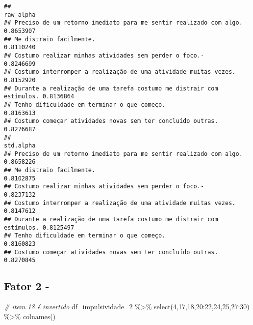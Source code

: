 \documentclass[
]{article}
\newenvironment{Shaded}{\begin{snugshade}}{\end{snugshade}}
\newcommand{\CommentTok}[1]{\textcolor[rgb]{0.56,0.35,0.01}{\textit{#1}}}
\newcommand{\DecValTok}[1]{\textcolor[rgb]{0.00,0.00,0.81}{#1}}
\newcommand{\FunctionTok}[1]{\textcolor[rgb]{0.00,0.00,0.00}{#1}}
\newcommand{\NormalTok}[1]{#1}
\newcommand{\SpecialCharTok}[1]{\textcolor[rgb]{0.00,0.00,0.00}{#1}}
\begin{document}
\begin{Shaded}
\end{Shaded}

\begin{verbatim}
##                                                                       raw_alpha
## Preciso de um retorno imediato para me sentir realizado com algo.     0.8653907
## Me distraio facilmente.                                               0.8110240
## Costumo realizar minhas atividades sem perder o foco.-                0.8246699
## Costumo interromper a realização de uma atividade muitas vezes.       0.8152920
## Durante a realização de uma tarefa costumo me distrair com estímulos. 0.8136864
## Tenho dificuldade em terminar o que começo.                           0.8163613
## Costumo começar atividades novas sem ter concluído outras.            0.8276687
##                                                                       std.alpha
## Preciso de um retorno imediato para me sentir realizado com algo.     0.8658226
## Me distraio facilmente.                                               0.8102875
## Costumo realizar minhas atividades sem perder o foco.-                0.8237132
## Costumo interromper a realização de uma atividade muitas vezes.       0.8147612
## Durante a realização de uma tarefa costumo me distrair com estímulos. 0.8125497
## Tenho dificuldade em terminar o que começo.                           0.8160823
## Costumo começar atividades novas sem ter concluído outras.            0.8270845
\end{verbatim}

\hypertarget{fator-2--}{%
\subsection{Fator 2 -}\label{fator-2--}}

\begin{Shaded}
\begin{Highlighting}[]
\CommentTok{\# item 18 é invertido}
\NormalTok{df\_impulsividade\_2 }\SpecialCharTok{\%\textgreater{}\%} \FunctionTok{select}\NormalTok{(}\DecValTok{4}\NormalTok{,}\DecValTok{17}\NormalTok{,}\DecValTok{18}\NormalTok{,}\DecValTok{20}\SpecialCharTok{:}\DecValTok{22}\NormalTok{,}\DecValTok{24}\NormalTok{,}\DecValTok{25}\NormalTok{,}\DecValTok{27}\SpecialCharTok{:}\DecValTok{30}\NormalTok{) }\SpecialCharTok{\%\textgreater{}\%} \FunctionTok{colnames}\NormalTok{() }
\end{Highlighting}
\end{Shaded}
\end{document}
